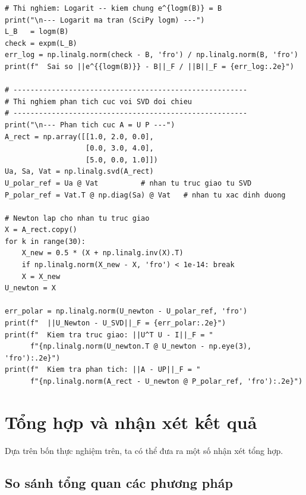 \documentclass[12pt,a4paper]{report}
\begin{document}
\begin{lstlisting}[style=python, caption={Thực nghiệm 4: hội tụ bậc hai của lặp Newton và Denman-Beavers}]
# Thi nghiem: Logarit -- kiem chung e^{logm(B)} = B
print("\n--- Logarit ma tran (SciPy logm) ---")
L_B   = logm(B)
check = expm(L_B)
err_log = np.linalg.norm(check - B, 'fro') / np.linalg.norm(B, 'fro')
print(f"  Sai so ||e^{{logm(B)}} - B||_F / ||B||_F = {err_log:.2e}")

# -------------------------------------------------------
# Thi nghiem phan tich cuc voi SVD doi chieu
# -------------------------------------------------------
print("\n--- Phan tich cuc A = U P ---")
A_rect = np.array([[1.0, 2.0, 0.0],
                   [0.0, 3.0, 4.0],
                   [5.0, 0.0, 1.0]])
Ua, Sa, Vat = np.linalg.svd(A_rect)
U_polar_ref = Ua @ Vat          # nhan tu truc giao tu SVD
P_polar_ref = Vat.T @ np.diag(Sa) @ Vat   # nhan tu xac dinh duong

# Newton lap cho nhan tu truc giao
X = A_rect.copy()
for k in range(30):
    X_new = 0.5 * (X + np.linalg.inv(X).T)
    if np.linalg.norm(X_new - X, 'fro') < 1e-14: break
    X = X_new
U_newton = X

err_polar = np.linalg.norm(U_newton - U_polar_ref, 'fro')
print(f"  ||U_Newton - U_SVD||_F = {err_polar:.2e}")
print(f"  Kiem tra truc giao: ||U^T U - I||_F = "
      f"{np.linalg.norm(U_newton.T @ U_newton - np.eye(3), 'fro'):.2e}")
print(f"  Kiem tra phan tich: ||A - UP||_F = "
      f"{np.linalg.norm(A_rect - U_newton @ P_polar_ref, 'fro'):.2e}")
\end{lstlisting}

\section{Tổng hợp và nhận xét kết quả}

Dựa trên bốn thực nghiệm trên, ta có thể đưa ra một số nhận xét tổng hợp.

\subsection{So sánh tổng quan các phương pháp}
\end{document}

